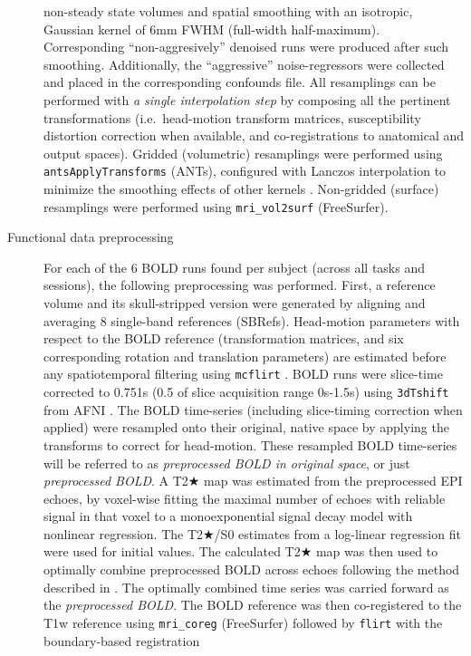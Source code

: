\documentclass[
]{article}
\begin{document}
\begin{description}
non-steady state volumes and spatial smoothing with an isotropic,
Gaussian kernel of 6mm FWHM (full-width half-maximum). Corresponding
``non-aggresively'' denoised runs were produced after such smoothing.
Additionally, the ``aggressive'' noise-regressors were collected and
placed in the corresponding confounds file. All resamplings can be
performed with \emph{a single interpolation step} by composing all the
pertinent transformations (i.e.~head-motion transform matrices,
susceptibility distortion correction when available, and
co-registrations to anatomical and output spaces). Gridded (volumetric)
resamplings were performed using \texttt{antsApplyTransforms} (ANTs),
configured with Lanczos interpolation to minimize the smoothing effects
of other kernels \citep{lanczos}. Non-gridded (surface) resamplings were
performed using \texttt{mri\_vol2surf} (FreeSurfer).
\item[Functional data preprocessing]
For each of the 6 BOLD runs found per subject (across all tasks and
sessions), the following preprocessing was performed. First, a reference
volume and its skull-stripped version were generated by aligning and
averaging 8 single-band references (SBRefs). Head-motion parameters with
respect to the BOLD reference (transformation matrices, and six
corresponding rotation and translation parameters) are estimated before
any spatiotemporal filtering using \texttt{mcflirt} \citep[FSL
6.0.5.1:57b01774,][]{mcflirt}. BOLD runs were slice-time corrected to
0.751s (0.5 of slice acquisition range 0s-1.5s) using \texttt{3dTshift}
from AFNI \citep[RRID:SCR\_005927]{afni}. The BOLD time-series
(including slice-timing correction when applied) were resampled onto
their original, native space by applying the transforms to correct for
head-motion. These resampled BOLD time-series will be referred to as
\emph{preprocessed BOLD in original space}, or just \emph{preprocessed
BOLD}. A T2★ map was estimated from the preprocessed EPI echoes, by
voxel-wise fitting the maximal number of echoes with reliable signal in
that voxel to a monoexponential signal decay model with nonlinear
regression. The T2★/S0 estimates from a log-linear regression fit were
used for initial values. The calculated T2★ map was then used to
optimally combine preprocessed BOLD across echoes following the method
described in \citep{posse_t2s}. The optimally combined time series was
carried forward as the \emph{preprocessed BOLD}. The BOLD reference was
then co-registered to the T1w reference using \texttt{mri\_coreg}
(FreeSurfer) followed by \texttt{flirt} \citep[FSL
6.0.5.1:57b01774,][]{flirt} with the boundary-based registration

\end{description}
\end{document}
